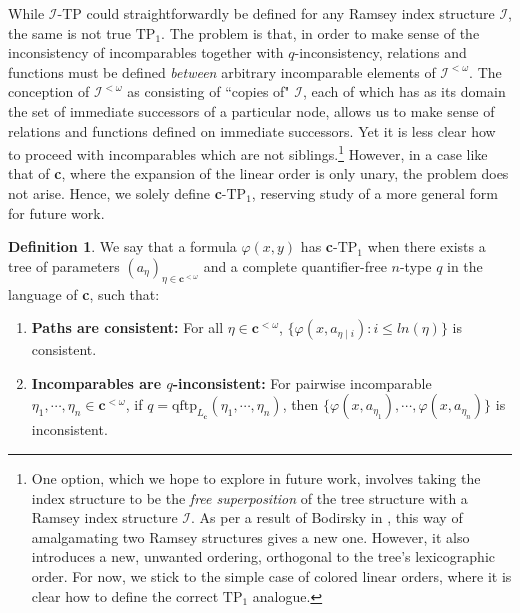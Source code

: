 \documentclass{article}
\newcommand{\calI}{\mathcal{I}}
\newcommand{\qftp}{\text{qftp}}
\newcommand{\TPi}{\text{TP}_1}
\newcommand{\vphi}{\varphi}
\theoremstyle{definition}
\newtheorem{definition}{Definition}
\theoremstyle{definition}
\theoremstyle{definition}
\theoremstyle{definition}
\begin{document}
While $\calI$-TP could straightforwardly be defined for any Ramsey index structure $\calI$, the same is not true $\TPi$. The problem is that, in order to make sense of the inconsistency of incomparables together with $q$-inconsistency, relations and functions must be defined \textit{between} arbitrary incomparable elements of $\calI^{<\omega}$. The conception of $\calI^{<\omega}$ as consisting of ``copies of" $\calI$, each of which has as its domain the set of immediate successors of a particular node, allows us to make sense of relations and functions defined on immediate successors. Yet it is less clear how to proceed with incomparables which are not siblings.\footnote{One option, which we hope to explore in future work, involves taking the index structure to be the \textit{free superposition} of the tree structure with a Ramsey index structure $\calI$. As per a result of Bodirsky in \cite{Bodirsky_2012}, this way of amalgamating two Ramsey structures gives a new one. However, it also introduces a new, unwanted ordering, orthogonal to the tree's lexicographic order. For now, we stick to the simple case of colored linear orders, where it is clear how to define the correct $\TPi$ analogue.} However, in a case like that of \textbf{c}, where the expansion of the linear order is only unary, the problem does not arise. Hence, we solely define \textbf{c}-$\TPi$, reserving study of a more general form for future work.

\begin{definition}{}\label{cTP1 definition}
        We say that a formula $\vphi(x,y)$ has \textbf{c}-$\text{TP}_1$ when there exists a tree of parameters $(a_\eta)_{\eta\in \textbf{c}^{<\omega}}$ and a complete quantifier-free $n$-type $q$ in the language of \textbf{c}, such that:

        \begin{enumerate}
    \item \textbf{Paths are consistent:} For all $\eta\in\textbf{c}^{<\omega}$, $\{\vphi(x, a_{\eta\mid i})\colon i\leq ln(\eta)\}$ is consistent.

   \item \textbf{Incomparables are $q$-inconsistent:} For pairwise incomparable $\eta_1,\dotsm, \eta_n\in\textbf{c}^{<\omega}$, if \newline $q= \qftp_{L_{\textbf{c}}}(\eta_1,\dotsm, \eta_n)$, then $\{\vphi(x,a_{\eta_1}),\dotsm, \vphi(x,a_{\eta_n})\}$ is inconsistent.

\end{enumerate}
\end{definition}
\end{document}
